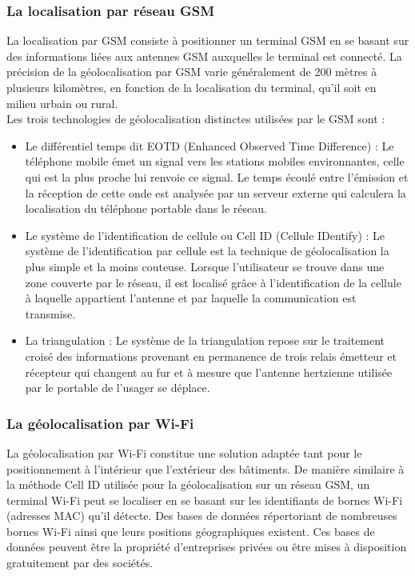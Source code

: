 \subsubsection{La localisation par réseau GSM}
La localisation par GSM consiste à positionner un terminal GSM en se basant sur des informations liées aux antennes GSM auxquelles le terminal est connecté. La précision de la géolocalisation par GSM varie généralement de 200 mètres à plusieurs kilomètres, en fonction de la localisation du terminal, qu'il soit en milieu urbain ou rural.\\

\noindent Les trois technologies de géolocalisation distinctes utilisées par le GSM sont :

\begin{itemize}
	\item Le différentiel temps dit EOTD (Enhanced Observed Time Difference) : Le téléphone mobile émet un signal vers les stations mobiles environnantes, celle qui est la plus proche lui renvoie ce signal. Le temps écoulé entre l’émission et la réception de cette onde est analysée par un serveur externe qui calculera la localisation du téléphone portable dans le réseau.
	
	\item Le système de l’identification de cellule ou Cell ID (Cellule IDentify) : Le système de l’identification par cellule est la technique de géolocalisation la plus simple et la moins couteuse. Lorsque l’utilisateur se trouve dans une zone couverte par le réseau, il est localisé grâce à l’identification de la cellule à laquelle appartient l’antenne et par laquelle la communication est transmise.
	
	\item La triangulation : Le système de la triangulation repose sur le traitement croisé des informations provenant en permanence de trois relais émetteur et récepteur qui changent au fur et à mesure que l’antenne hertzienne utilisée par le portable de l’usager se déplace.
\end{itemize}

\subsubsection{La géolocalisation par Wi-Fi} 
La géolocalisation par Wi-Fi constitue une solution adaptée tant pour le positionnement à l'intérieur que l'extérieur des bâtiments.
De manière similaire à la méthode Cell ID utilisée pour la géolocalisation sur un réseau GSM, un terminal Wi-Fi peut se localiser en se basant sur les identifiants de bornes Wi-Fi (adresses MAC) qu'il détecte. Des bases de données répertoriant de nombreuses bornes Wi-Fi ainsi que leurs positions géographiques existent. Ces bases de données peuvent être la propriété d'entreprises privées ou être mises à disposition gratuitement par des sociétés.

